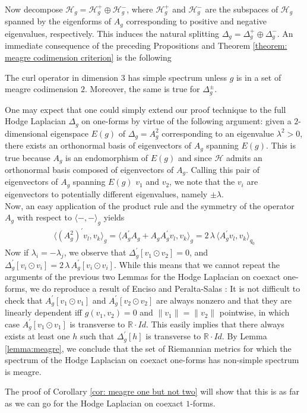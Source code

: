Now decompose $\mathcal{H}_g=\mathcal{H}_g^+\oplus \mathcal{H}_g^-$, where $\mathcal{H}_g^+$ and $\mathcal{H}_g^-$ are the subspaces of $\mathcal{H}_g$ spanned by the eigenforms of $A_g$ corresponding to positive and negative eigenvalues, respectively. This induces the natural splitting $\Delta_g=\Delta^+_g\oplus\Delta_g^-$.
An immediate consequence of the preceding Propositions and Theorem \ref{theorem: meagre codimension criterion} is the following

\begin{thm}
    The curl operator in dimension $3$ has simple spectrum unless $g$ is in a set of meagre codimension $2$. Moreover, the same is true for $\Delta_g^\pm$.
\end{thm}

\begin{rmk}
    One may expect that one could simply extend our proof technique to the full Hodge Laplacian $\Delta_g$ on one-forms by virtue of the following argument: given a $2$-dimensional eigenspace $E(g)$ of $\Delta_g=A_g^2$ corresponding to an eigenvalue $\lambda^2 >0$, there exists an orthonormal basis of eigenvectors of $A_g$ spanning $E(g)$. This is true because $A_g$ is an endomorphism of $E(g)$ and since $\mathcal{H}$ admits an orthonormal basis composed of eigenvectors of $A_g$. Calling this pair of eigenvectors of $A_g$ spanning $E(g)$ $v_1$ and $v_2$, we note that the $v_i$ are eigenvectors to potentially different eigenvalues, namely $\pm \lambda$.\\
Now, an easy application of the product rule and the symmetry of the operator $A_g$ with respect to $\langle-,-\rangle_g$ yields
\begin{align*}
    \langle (A_g^2)^\prime v_l,v_k\rangle_{g}=\langle A_g^\prime A_g+A_gA^\prime_g v_l,v_k\rangle_{g}=2\,\lambda\,\langle A_g^\prime v_l,v_k\rangle_{q_0}  
\end{align*}
Now if $\lambda_i=-\lambda_j$, we observe that $\Delta_g^{\prime}[v_1\odot v_2]=0$, and $\Delta_g^{\prime}[v_i\odot v_i]=2\,\lambda\,A_g^{\prime}[v_i\odot v_i]$. While this means that we cannot repeat the arguments of the previous two Lemmas for the Hodge Laplacian on coexact one-forms, we do reproduce a result of Enciso and Peralta-Salas \cite{Enciso2012}: It is not difficult to check that $A_g^{\prime}[v_1\odot v_1]$ and $A_g^{\prime}[v_2\odot v_2]$ are always nonzero and that they are linearly dependent iff $g(v_1,v_2)=0$ and $\lVert v_1\rVert=\lVert v_2\rVert$ pointwise, in which case $A_g^{\prime}[v_1\odot v_1]$ is transverse to $\mathbb{R}\cdot Id$. This easily implies that there always exists at least one $h$ such that $\Delta_g^{\prime}[h]$ is transverse to $\mathbb{R}\cdot Id$. By Lemma \ref{lemma:meagre}, we conclude that the set of Riemannian metrics for which the spectrum of the Hodge Laplacian on coexact one-forms has non-simple spectrum is meagre.\par
The proof of Corollary \ref{cor: meagre one but not two} will show that this is as far as we can go for the Hodge Laplacian on coexact $1$-forms.
\end{rmk}




